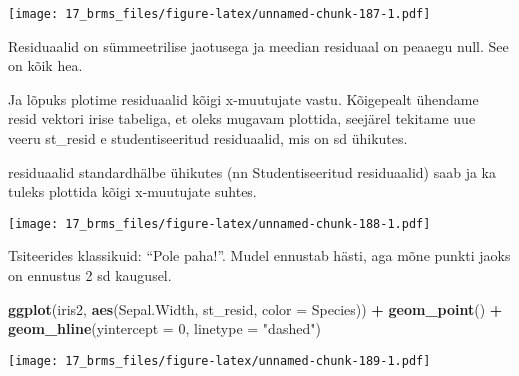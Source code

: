 \documentclass[]{article}
\newenvironment{Shaded}{\begin{snugshade}}{\end{snugshade}}
\newcommand{\KeywordTok}[1]{\textcolor[rgb]{0.13,0.29,0.53}{\textbf{#1}}}
\newcommand{\DataTypeTok}[1]{\textcolor[rgb]{0.13,0.29,0.53}{#1}}
\newcommand{\DecValTok}[1]{\textcolor[rgb]{0.00,0.00,0.81}{#1}}
\newcommand{\StringTok}[1]{\textcolor[rgb]{0.31,0.60,0.02}{#1}}
\newcommand{\OperatorTok}[1]{\textcolor[rgb]{0.81,0.36,0.00}{\textbf{#1}}}
\newcommand{\NormalTok}[1]{#1}
\begin{document}
\texttt{[image: 17\_brms\_files/figure-latex/unnamed-chunk-187-1.pdf]}

Residuaalid on sümmeetrilise jaotusega ja meedian residuaal on peaaegu
null. See on kõik hea.

Ja lõpuks plotime residuaalid kõigi x-muutujate vastu. Kõigepealt
ühendame resid vektori irise tabeliga, et oleks mugavam plottida,
seejärel tekitame uue veeru st\_resid e studentiseeritud residuaalid,
mis on sd ühikutes.

residuaalid standardhälbe ühikutes (nn Studentiseeritud residuaalid)
saab ja ka tuleks plottida kõigi x-muutujate suhtes.

\begin{Shaded}
\end{Shaded}

\texttt{[image: 17\_brms\_files/figure-latex/unnamed-chunk-188-1.pdf]}

Tsiteerides klassikuid: ``Pole paha!''. Mudel ennustab hästi, aga mõne
punkti jaoks on ennustus 2 sd kaugusel.

\begin{Shaded}
\begin{Highlighting}[]
\KeywordTok{ggplot}\NormalTok{(iris2, }\KeywordTok{aes}\NormalTok{(Sepal.Width, st_resid, }\DataTypeTok{color =}\NormalTok{ Species)) }\OperatorTok{+}\StringTok{ }
\StringTok{  }\KeywordTok{geom_point}\NormalTok{() }\OperatorTok{+}
\StringTok{  }\KeywordTok{geom_hline}\NormalTok{(}\DataTypeTok{yintercept =} \DecValTok{0}\NormalTok{, }\DataTypeTok{linetype =} \StringTok{"dashed"}\NormalTok{)}
\end{Highlighting}
\end{Shaded}

\texttt{[image: 17\_brms\_files/figure-latex/unnamed-chunk-189-1.pdf]}
\end{document}
